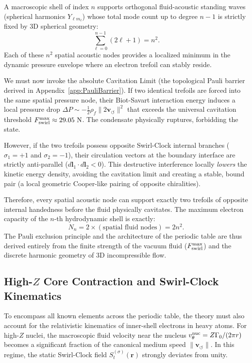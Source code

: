 \documentclass[11pt,a4paper]{article}
\begin{document}
A macroscopic shell of index $n$ supports orthogonal fluid-acoustic standing waves (spherical harmonics $Y_{\ell m_\ell}$) whose total mode count up to degree $n-1$ is strictly fixed by 3D spherical geometry:
\begin{equation}
\label{eq:SphericalHarmonics}
\sum_{\ell=0}^{n-1} (2\ell + 1) = n^2.
\end{equation}
Each of these $n^2$ spatial acoustic nodes provides a localized minimum in the dynamic pressure envelope where an electron trefoil can stably reside.

We must now invoke the absolute Cavitation Limit (the topological Pauli barrier derived in Appendix~\ref{app:PauliBarrier}). If two identical trefoils are forced into the same spatial pressure node, their Biot-Savart interaction energy induces a local pressure drop $\Delta P \sim -\frac{1}{2}\rho_{\!f} \lVert 2\mathbf{v}_{\!\boldsymbol{\circlearrowleft}} \rVert^2$ that exceeds the universal cavitation threshold $F_{\rm swirl}^{\max} \approx 29.05\ \mathrm{N}$. The condensate physically ruptures, forbidding the state.

However, if the two trefoils possess opposite Swirl-Clock internal branches ($\sigma_1 = +1$ and $\sigma_2 = -1$), their circulation vectors at the boundary interface are strictly anti-parallel ($d\mathbf{l}_1 \cdot d\mathbf{l}_2 < 0$). This destructive interference locally \emph{lowers} the kinetic energy density, avoiding the cavitation limit and creating a stable, bound pair (a local geometric Cooper-like pairing of opposite chiralities).

Therefore, every spatial acoustic node can support exactly two trefoils of opposite internal handedness before the fluid physically cavitates. The maximum electron capacity of the $n$-th hydrodynamic shell is exactly:
\begin{equation}
\label{eq:AufbauDerived}
\boxed{
N_n = 2 \times (\text{spatial fluid nodes}) = 2n^2.
}
\end{equation}
The Pauli exclusion principle and the architecture of the periodic table are thus derived entirely from the finite strength of the vacuum fluid ($F_{\rm swirl}^{\max}$) and the discrete harmonic geometry of 3D incompressible flow.

\subsection{High-$Z$ Core Contraction and Swirl-Clock Kinematics}
To encompass all known elements across the periodic table, the theory must also account for the relativistic kinematics of inner-shell electrons in heavy atoms. For high-$Z$ nuclei, the macroscopic fluid velocity near the nucleus $v_{\theta}^{\rm nuc} = Z \Gamma_0 / (2\pi r)$ becomes a significant fraction of the canonical medium speed $\lVert\mathbf{v}_{\!\boldsymbol{\circlearrowleft}}\rVert$. In this regime, the static Swirl-Clock field $S_t^{(\sigma)}(\mathbf r)$ strongly deviates from unity.
\end{document}
